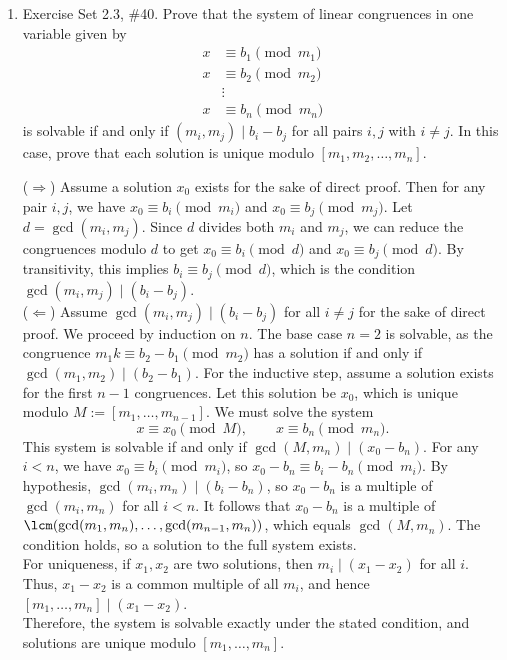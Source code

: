 \begin{enumerate}
\newpage
\item Exercise Set 2.3, \#40.
Prove that the system of linear congruences in one variable given by 
\begin{align*}
x & \equiv b_1 \pmod{m_1} \\
x & \equiv b_2 \pmod{m_2} \\
& \vdots \\
x & \equiv b_n \pmod{m_n}
\end{align*}
is solvable if and only if $(m_i,m_j) \mid b_i-b_j$ for all pairs $i,j$ with $i \neq j$. In this case, prove that each solution is unique modulo $[m_1,m_2,\ldots,m_n]$.
\begin{subprove}
  ($\Rightarrow$) Assume a solution $x_0$ exists for the sake of direct proof. 
  Then for any pair $i,j$, we have $x_0 \equiv b_i \pmod{m_i}$ and $x_0 \equiv b_j \pmod{m_j}$. 
  Let $d = \gcd(m_i, m_j)$. Since $d$ divides both $m_i$ and $m_j$, we can reduce the congruences 
  modulo $d$ to get $x_0 \equiv b_i \pmod d$ and $x_0 \equiv b_j \pmod d$. By transitivity, this 
  implies $b_i \equiv b_j \pmod d$, which is the condition $\gcd(m_i, m_j) \mid (b_i - b_j)$.\vspace*{10px}\\
  ($\Leftarrow$) Assume $\gcd(m_i,m_j)\mid(b_i-b_j)$ for all $i\ne j$ for the sake of direct proof. 
  We proceed by induction on $n$. The base case $n=2$ is solvable, as the congruence 
  $m_1 k \equiv b_2 - b_1 \pmod{m_2}$ has a solution if and only if $\gcd(m_1, m_2) \mid (b_2 - b_1)$. 
  For the inductive step, assume a solution exists for the first $n-1$ congruences. Let this solution 
  be $x_0$, which is unique modulo $M:=[m_1,\dots,m_{n-1}]$. We must solve the system
  \[
    x\equiv x_0\pmod{M},\qquad x\equiv b_n\pmod{m_n}.
  \]
  This system is solvable if and only if $\gcd(M,m_n)\mid(x_0-b_n)$. For any $i < n$, we have 
  $x_0 \equiv b_i \pmod{m_i}$, so $x_0-b_n \equiv b_i-b_n \pmod{m_i}$. By hypothesis, 
  $\gcd(m_i,m_n)\mid(b_i-b_n)$, so $x_0-b_n$ is a multiple of $\gcd(m_i,m_n)$ for all $i<n$. 
  It follows that $x_0-b_n$ is a multiple of $\lcm(\gcd(m_1,m_n), \dots, \gcd(m_{n-1},m_n))$, 
  which equals $\gcd(M,m_n)$. The condition holds, so a solution to the full system exists.\vspace*{10px}\\
  For uniqueness, if $x_1,x_2$ are two solutions, then $m_i\mid(x_1-x_2)$ for all $i$. 
  Thus, $x_1-x_2$ is a common multiple of all $m_i$, and hence $[m_1,\dots,m_n]\mid(x_1-x_2)$.
  \vspace*{10px}\\
  Therefore, the system is solvable exactly under the stated condition, 
  and solutions are unique modulo $[m_1,\dots,m_n]$.
\end{subprove}






\end{enumerate}
